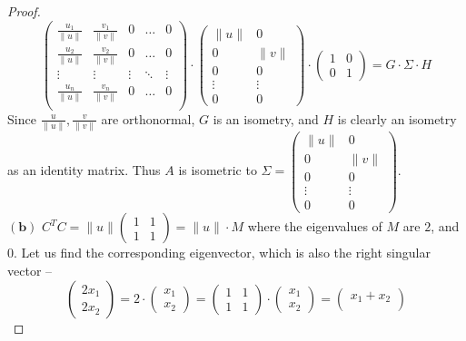 \documentclass[11pt]{article}
\theoremstyle{quest}
\begin{document}
\begin{proof}
$$\begin{pmatrix}
\frac{u_1}{\|u\|} & \frac{v_1}{\|v\|} & 0 & \ldots & 0 \\
\frac{u_2}{\|u\|} & \frac{v_2}{\|v\|} & 0 & \ldots & 0 \\
\vdots & \vdots & \vdots & \ddots & \vdots \\
\frac{u_n}{\|u\|} & \frac{v_n}{\|v\|} & 0 & \ldots & 0 \\
\end{pmatrix} \cdot  \begin{pmatrix}
\|u\| & 0 \\
0 & \|v\| \\
0 & 0 \\
\vdots & \vdots \\
0 & 0
\end{pmatrix} \cdot \begin{pmatrix}
1 & 0 \\
0 & 1
\end{pmatrix} = G \cdot \Sigma \cdot H$$
Since $\frac{u}{\|u\|}, \frac{v}{\|v\|}$ are orthonormal, $G$ is an isometry, and $H$ is clearly an isometry as an identity matrix. Thus $A$ is isometric to $\Sigma = \begin{pmatrix}
\|u\| & 0 \\
0 & \|v\| \\
0 & 0 \\
\vdots & \vdots \\
0 & 0
\end{pmatrix}$.
\\$\mathbf{(b)}$ $C^TC = \|u\| \begin{pmatrix}
1 & 1 \\
1 & 1
\end{pmatrix} = \|u\| \cdot M$ where the eigenvalues of $M$ are $2$, and $0$. Let us find the corresponding eigenvector, which is also the right singular vector --
$$\begin{pmatrix}
2x_1 \\
2x_2
\end{pmatrix} = 2 \cdot \begin{pmatrix}
x_1 \\
x_2
\end{pmatrix} = \begin{pmatrix}
1 & 1 \\
1 & 1
\end{pmatrix} \cdot \begin{pmatrix}
x_1 \\
x_2
\end{pmatrix} = \begin{pmatrix}
x_1 + x_2\\

\end{pmatrix}$$
\end{proof}
\end{document}
